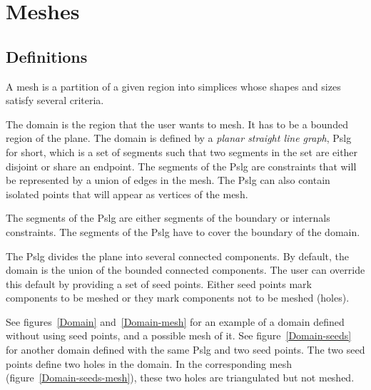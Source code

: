 \section{Meshes}
\label{sec:Mesh_2_meshes}


\subsection{Definitions}
\label{sec:Mesh_2_meshes_definition}

A mesh is a partition of a given region into simplices whose shapes
and sizes satisfy several criteria.

The domain is the region that the user wants to mesh. It has to be
  a bounded region of the plane. The domain is defined by a \emph{planar
  straight line graph}, {\sc Pslg} for short, which is a set of segments
  such that two segments in the set are either disjoint or share an
  endpoint. The segments of the {\sc Pslg} are constraints that will be
  represented by a union of edges in the mesh. The {\sc Pslg} can also
  contain isolated points that will appear as vertices of the mesh.

The segments of the {\sc Pslg} are either segments of the
boundary or internals constraints. The segments of the {\sc Pslg} have to
cover the boundary of the domain.

The {\sc Pslg} divides the plane into several connected components. By
default, the domain is the union of the bounded connected components. The
user can override this default by providing a set of seed points. Either
seed points mark components to be meshed or they mark components not to be
meshed (holes).

See figures~\ref{Domain} and~\ref{Domain-mesh} for an example of a domain
defined without using seed points, and a possible mesh of it. See
figure~\ref{Domain-seeds} for another domain defined with the same {\sc
  Pslg} and two seed points. The two seed points define two holes in the
domain. In the corresponding mesh (figure~\ref{Domain-seeds-mesh}), these
two holes are triangulated but not meshed.

